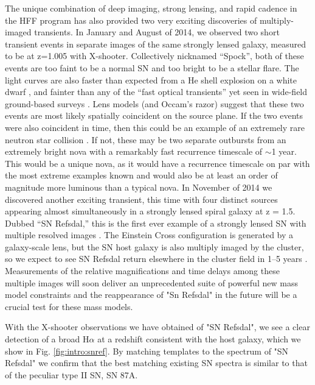 The unique combination of deep imaging, strong lensing, and rapid cadence in the
HFF program has also provided two very exciting discoveries of multiply-imaged
transients. In January and August of 2014, we observed two short transient
events in separate images of the same strongly lensed galaxy, measured to be at
z=1.005 with X-shooter. Collectively nicknamed “Spock”, both
of these events are too faint to be a normal SN and too bright to be a stellar
flare. The light curves are also faster than expected from a He shell explosion
on a white dwarf \citep[a “.Ia” event][]{Bildsten2007}, and fainter than any of
the “fast optical transients” yet seen in wide-field ground-based surveys
\citep[e.g.][]{Kasliwal2010, Poznanski2010a, Vinko2014}.
Lens models (and Occam’s razor) suggest that these two events are most likely
spatially coincident on the source plane. If the two events were also coincident
in time, then this could be an example of an extremely rare neutron star
collision \citep[a “kilonova”][]{Tanvir2013, Barnes2013}. If not, these may be
two separate outbursts from an extremely bright nova with a remarkably fast
recurrence timescale of $\sim$1 year. This would be a unique nova, as it would
have a recurrence timescale on par with the most extreme examples known
\citep{Tang2014} and would also be at least an order of magnitude more luminous
than a typical nova.
In November of 2014 we discovered another exciting transient, this time with
four distinct sources appearing almost simultaneously in a strongly lensed
spiral galaxy at z = 1.5. Dubbed “SN Refsdal,” this is the first ever example of
a strongly lensed SN with multiple resolved images \citep[][Figure
3]{Kelly2014}. The Einstein Cross configuration is generated by a galaxy-scale
lens, but the SN host galaxy is also multiply imaged by the cluster, so we
expect to see SN Refsdal return elsewhere in the cluster field in 1–5 years
\citep{Oguri2015, Sharon2015}. Measurements of the relative magnifications and
time delays among these multiple images will soon deliver an unprecedented suite
of powerful new mass model constraints and the reappearance of "Sn Refsdal" in the future will be a crucial test for these mass models. 

With the X-shooter observations we have obtained of "SN Refsdal", we see a clear
detection of a broad H$\alpha$ at a redshift consistent with the host galaxy,
which we show in Fig. \ref{fig:intro:snref}. By matching templates to the
spectrum of "SN Refsdal" we confirm that the best matching existing SN spectra
is similar to that of the peculiar type II SN, SN 87A. 


